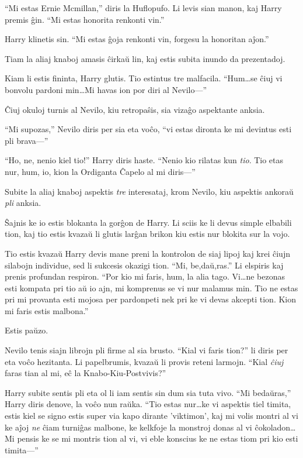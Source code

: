 ``Mi estas Ernie Mcmillan,'' diris la Huflopufo. Li levis sian manon,
kaj Harry premis ĝin. ``Mi estas honorita renkonti vin.''

Harry klinetis sin. ``Mi estas ĝoja renkonti vin, forgesu la
honoritan aĵon.''

Tiam la aliaj knaboj amasis ĉirkaŭ lin, kaj estis subita inundo da prezentadoj.

Kiam li estis fininta, Harry glutis. Tio estintus tre
malfacila. ``Hum\ldots se ĉiuj vi bonvolu pardoni min\ldots Mi havas
ion por diri al Nevilo—''

Ĉiuj okuloj turnis al Nevilo, kiu retropaŝis, sia vizaĝo aspektante
anksia.

``Mi supozas,'' Nevilo diris per sia eta voĉo, ``vi estas dironta ke
mi devintus esti pli brava—''

``Ho, ne, nenio kiel tio!'' Harry diris haste. ``Nenio kio rilatas kun
\emph{tio}. Tio etas nur, hum, io, kion la Ordiganta Ĉapelo al mi
diris—''

Subite la aliaj knaboj aspektis \emph{tre} interesataj, krom Nevilo,
kiu aspektis ankoraŭ \emph{pli} anksia.

Ŝajnis ke io estis blokanta la gorĝon de Harry. Li sciis ke li devus simple
elbabili tion, kaj tio estis kvazaŭ li glutis larĝan brikon kiu estis nur
blokita sur la vojo.

Tio estis kvazaŭ Harry devis mane preni la kontrolon de siaj lipoj kaj krei
ĉiujn silabojn individue, sed li sukcesis okazigi tion. ``Mi, be,daŭ,ras.'' Li
elspiris kaj prenis profundan respiron. ``Por kio mi faris, hum, la alia tago.
Vi\ldots ne bezonas esti kompata pri tio aŭ io ajn, mi komprenus se vi nur
malamus min. Tio ne estas pri mi provanta esti mojosa per pardonpeti nek pri ke
vi devas akcepti tion. Kion mi faris estis malbona.''

Estis paŭzo.

Nevilo tenis siajn librojn pli firme al sia brusto. ``Kial vi faris
tion?'' li diris per eta voĉo hezitanta. Li papelbrumis, kvazaŭ li
provis reteni larmojn.  ``Kial \emph{ĉiuj} faras tian al mi, eĉ la
Knabo-Kiu-Postvivis?''

Harry subite sentis pli eta ol li iam sentis sin dum sia tuta vivo. ``Mi
bedaŭras,'' Harry diris denove, la voĉo nun raŭka. ``Tio estas nur\ldots ke vi
aspektis tiel timita, estis kiel se signo estis super via kapo dirante
'viktimon', kaj mi volis montri al vi ke aĵoj \emph{ne} ĉiam turniĝas malbone,
ke kelkfoje la monstroj donas al vi ĉokoladon\ldots Mi pensis ke se mi montris
tion al vi, vi eble konscius ke ne estas tiom pri kio esti timita—''

